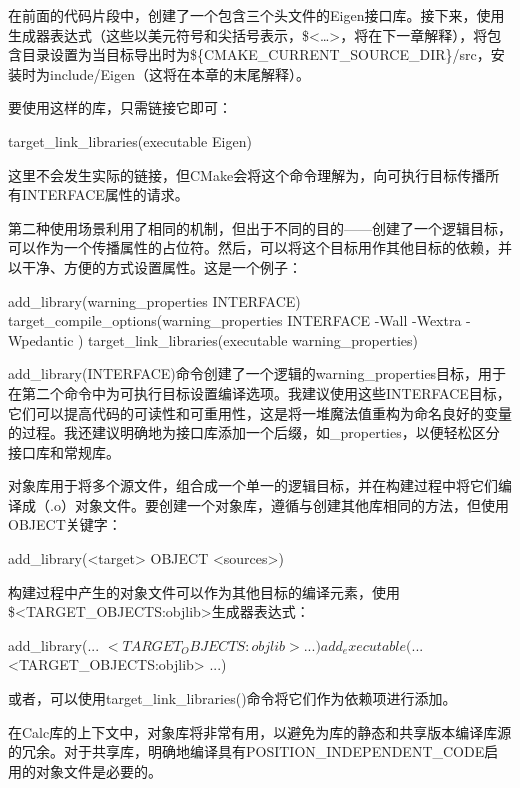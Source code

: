在前面的代码片段中，创建了一个包含三个头文件的Eigen接口库。接下来，使用生成器表达式（这些以美元符号和尖括号表示，\$<…>，将在下一章解释），将包含目录设置为当目标导出时为\$\{CMAKE\_CURRENT\_SOURCE\_DIR\}/src，安装时为include/Eigen（这将在本章的末尾解释）。

要使用这样的库，只需链接它即可：

\begin{cmake}
target_link_libraries(executable Eigen)
\end{cmake}

这里不会发生实际的链接，但CMake会将这个命令理解为，向可执行目标传播所有INTERFACE属性的请求。

第二种使用场景利用了相同的机制，但出于不同的目的——创建了一个逻辑目标，可以作为一个传播属性的占位符。然后，可以将这个目标用作其他目标的依赖，并以干净、方便的方式设置属性。这是一个例子：

\begin{cmake}
add_library(warning_properties INTERFACE)
target_compile_options(warning_properties INTERFACE
    -Wall -Wextra -Wpedantic
)
target_link_libraries(executable warning_properties)
\end{cmake}

add\_library(INTERFACE)命令创建了一个逻辑的warning\_properties目标，用于在第二个命令中为可执行目标设置编译选项。我建议使用这些INTERFACE目标，它们可以提高代码的可读性和可重用性，这是将一堆魔法值重构为命名良好的变量的过程。我还建议明确地为接口库添加一个后缀，如\_properties，以便轻松区分接口库和常规库。


对象库用于将多个源文件，组合成一个单一的逻辑目标，并在构建过程中将它们编译成（.o）对象文件。要创建一个对象库，遵循与创建其他库相同的方法，但使用OBJECT关键字：

\begin{shell}
add_library(<target> OBJECT <sources>)
\end{shell}

构建过程中产生的对象文件可以作为其他目标的编译元素，使用\$<TARGET\_OBJECTS:objlib>生成器表达式：

\begin{shell}
add_library(... $<TARGET_OBJECTS:objlib> ...)
add_executable(... $<TARGET_OBJECTS:objlib> ...)
\end{shell}

或者，可以使用target\_link\_libraries()命令将它们作为依赖项进行添加。

在Calc库的上下文中，对象库将非常有用，以避免为库的静态和共享版本编译库源的冗余。对于共享库，明确地编译具有POSITION\_INDEPENDENT\_CODE启用的对象文件是必要的。

